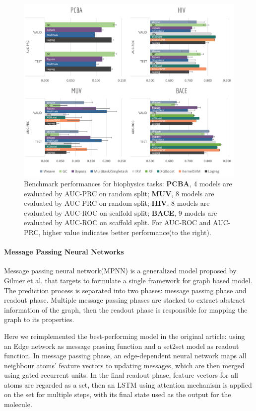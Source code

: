 \begin{figure}[htb]
  \centering
  \includegraphics[width=.85\textwidth]{Images/Biophysics.png}
  \caption{Benchmark performances for biophysics tasks: \textbf{PCBA}, 4 models are evaluated by AUC-PRC on random split; \textbf{MUV}, 8 models are evaluated by AUC-PRC on random split; \textbf{HIV}, 8 models are evaluated by AUC-ROC on scaffold split; \textbf{BACE}, 9 models are evaluated by AUC-ROC on scaffold split. For AUC-ROC and AUC-PRC, higher value indicates better performance(to the right).}
  \label{fig:PCBA_HIV_MUV_BACE}
\end{figure}

\paragraph{Message Passing Neural Networks}

Message passing neural network(MPNN) is a generalized model proposed by Gilmer et al.\cite{MPNN} that targets to formulate a single framework for graph based model. The prediction process is separated into two phases: message passing phase and readout phase. Multiple message passing phases are stacked to extract abstract information of the graph, then the readout phase is responsible for mapping the graph to its properties.

Here we reimplemented the best-performing model in the original article: using an Edge network as message passing function and a set2set model\cite{set2set} as readout function. In message passing phase, an edge-dependent neural network maps all neighbour atoms' feature vectors to updating messages, which are then merged using gated recurrent units. In the final readout phase, feature vectors for all atoms are regarded as a set, then an LSTM using attention mechanism is applied on the set for multiple steps, with its final state used as the output for the molecule.

